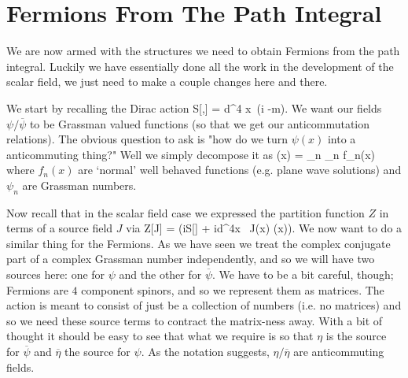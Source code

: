 \section{Fermions From The Path Integral}

We are now armed with the structures we need to obtain Fermions from the path integral. Luckily we have essentially done all the work in the development of the scalar field, we just need to make a couple changes here and there. 

We start by recalling the Dirac action
\be 
\label{eqn:DiracAction}
    S[\psi,\overline{\psi}] = \int d^4 x\, \overline{\psi}(i\slashed{\p} -m)\psi. 
\ee
We want our fields $\psi/\overline{\psi}$ to be Grassman valued functions (so that we get our anticommutation relations). The obvious question to ask is "how do we turn $\psi(x)$ into a anticommuting thing?" Well we simply decompose it as 
\bse 
    \psi(x) = \sum_n \psi_n f_n(x)
\ese
where $f_n(x)$ are `normal' well behaved functions (e.g. plane wave solutions) and $\psi_n$ are Grassman numbers. 

Now recall that in the scalar field case we expressed the partition function $Z$ in terms of a source field $J$ via 
\bse
    Z[J] = \int [\pD\phi] \exp\bigg(iS[\phi] + i\int d^4x \, J(x) \phi(x)\bigg).
\ese 
We now want to do a similar thing for the Fermions. As we have seen we treat the complex conjugate part of a complex Grassman number independently, and so we will have two sources here: one for $\psi$ and the other for $\overline{\psi}$. We have to be a bit careful, though; Fermions are $4$ component spinors, and so we represent them as matrices. The action is meant to consist of just be a collection of numbers (i.e. no matrices) and so we need these source terms to contract the matrix-ness away. With a bit of thought it should be easy to see that what we require is 
\noindent so that $\eta$ is the source for $\overline{\psi}$ and $\overline{\eta}$ the source for $\psi$. As the notation suggests, $\eta/\overline{\eta}$ are anticommuting fields. 

